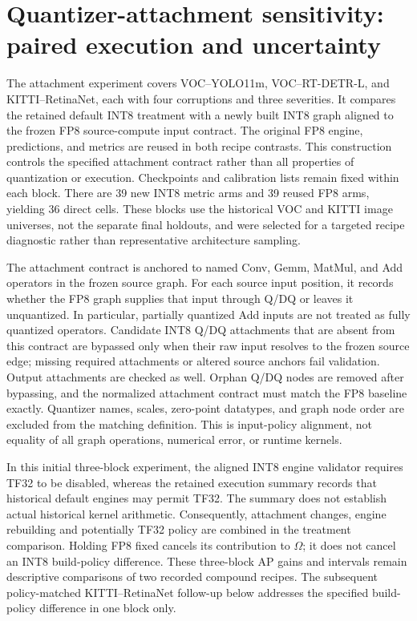 \documentclass[10pt]{article}
\begin{document}
\FloatBarrier

\section{Quantizer-attachment sensitivity: paired execution and uncertainty}
\label{sec:supp-attachment}

The attachment experiment covers VOC--YOLO11m, VOC--RT-DETR-L, and KITTI--RetinaNet, each with four corruptions and three severities. It compares the retained default INT8 treatment with a newly built INT8 graph aligned to the frozen FP8 source-compute input contract. The original FP8 engine, predictions, and metrics are reused in both recipe contrasts. This construction controls the specified attachment contract rather than all properties of quantization or execution. Checkpoints and calibration lists remain fixed within each block. There are 39 new INT8 metric arms and 39 reused FP8 arms, yielding 36 direct cells. These blocks use the historical VOC and KITTI image universes, not the separate final holdouts, and were selected for a targeted recipe diagnostic rather than representative architecture sampling.

The attachment contract is anchored to named Conv, Gemm, MatMul, and Add operators in the frozen source graph. For each source input position, it records whether the FP8 graph supplies that input through Q/DQ or leaves it unquantized. In particular, partially quantized Add inputs are not treated as fully quantized operators. Candidate INT8 Q/DQ attachments that are absent from this contract are bypassed only when their raw input resolves to the frozen source edge; missing required attachments or altered source anchors fail validation. Output attachments are checked as well. Orphan Q/DQ nodes are removed after bypassing, and the normalized attachment contract must match the FP8 baseline exactly. Quantizer names, scales, zero-point datatypes, and graph node order are excluded from the matching definition. This is input-policy alignment, not equality of all graph operations, numerical error, or runtime kernels.

In this initial three-block experiment, the aligned INT8 engine validator requires TF32 to be disabled, whereas the retained execution summary records that historical default engines may permit TF32. The summary does not establish actual historical kernel arithmetic. Consequently, attachment changes, engine rebuilding and potentially TF32 policy are combined in the treatment comparison. Holding FP8 fixed cancels its contribution to $\Omega$; it does not cancel an INT8 build-policy difference. These three-block AP gains and intervals remain descriptive comparisons of two recorded compound recipes. The subsequent policy-matched KITTI--RetinaNet follow-up below addresses the specified build-policy difference in one block only.
\end{document}
